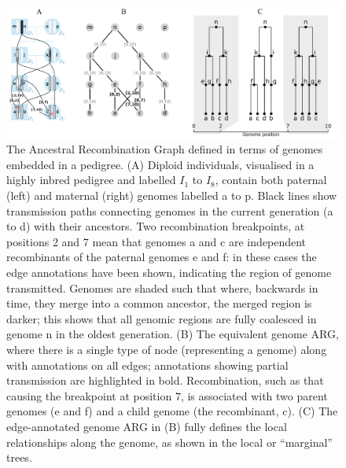 \documentclass{article}
\begin{document}
\begin{figure}
\begin{center}
    \includegraphics[width=\textwidth]{illustrations/arg-in-pedigree}
\end{center}
\caption{\label{fig-arg-in-pedigree}
The Ancestral Recombination Graph defined in terms of genomes embedded
in a pedigree. (A) Diploid individuals, visualised in a highly inbred pedigree and
labelled $I_1$ to $I_8$, contain both paternal (left) and maternal (right) genomes
labelled \textsf{a} to \textsf{p}. Black lines show transmission paths connecting
genomes in the current generation (\textsf{a} to \textsf{d}) with their ancestors.
Two recombination breakpoints, at positions 2 and 7 mean that genomes \textsf{a}
and \textsf{c} are independent recombinants of the paternal genomes \textsf{e}
and \textsf{f}: in these cases the edge annotations have been shown, indicating the
region of genome transmitted. Genomes are shaded such that where, backwards in time,
they merge into a common ancestor, the merged region is darker; this shows that all
genomic regions are fully coalesced in genome \textsf{n} in the oldest generation.
(B) The equivalent genome ARG, where there is a single type of node (representing
a genome) along with annotations on all edges; annotations showing partial
transmission are highlighted in bold. Recombination, such as that causing the
breakpoint at position 7, is associated with two parent genomes (\textsf{e} and
\textsf{f}) and a child genome (the recombinant, \textsf{c}).
(C) The edge-annotated genome ARG in (B) fully defines the
local relationships along the genome, as shown in the local
or ``marginal'' trees.
}
\end{figure}
\end{document}
